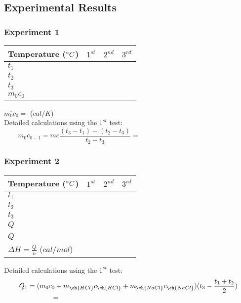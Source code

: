 \subsection{Experimental Results}

\subsubsection{Experiment 1}

\begin{table}[ht]
	\centering
	{\renewcommand{\arraystretch}{1.75}
	\begin{tabular}{|p{3cm}|p{3cm}|p{3cm}|p{3cm}|}
		\hline
		Temperature ($\degree C$) & $1^{st}$ & $2^{nd}$ & $3^{rd}$ \\ \hline
		$t_1$ & & & \\ \hline
		$t_2$ & & & \\ \hline
		$t_3$ & & & \\ \hline
		$m_0c_0$ & & & \\ \hline
	\end{tabular}}
\end{table}
$\displaystyle \overline{m_0c_0}=$ \hspace{2cm} ($cal/K$)\\

Detailed calculations using the $1^{st}$ test: \[m_0c_{0-1} = mc \frac{(t_3-t_1)-(t_2-t_3)}{t_2-t_3}= \hspace{6cm}\]	

\subsubsection{Experiment 2}

\begin{table}[ht]
	\centering
	{\renewcommand{\arraystretch}{1.75}
		\begin{tabular}{|p{3.5cm}|p{3cm}|p{3cm}|p{3cm}|}
			\hline
			Temperature ($\degree C$) & $1^{st}$ & $2^{nd}$ & $3^{rd}$ \\ \hline
			$t_1$ & & & \\ \hline
			$t_2$ & & & \\ \hline
			$t_3$ & & & \\ \hline
			$Q$ & & & \\ \hline
			$\overline{Q}$ & \multicolumn{3}{l|}{} \\ \hline
			$\Delta H = \frac{\overline{Q}}{n}$ ($cal/mol$) & \multicolumn{3}{l|}{} \\ \hline
	\end{tabular}}
\end{table}
Detailed calculations using the $1^{st}$ test:
\[Q_1 = (m_0c_0 + m_{\ch{HCl}}c_{\ch{HCl}}+m_{\ch{NaCl}}c_{\ch{NaCl}})(t_3-\frac{t_1+t_2}{2})\]
\[= \hspace{7.4cm}\]
\newpage

